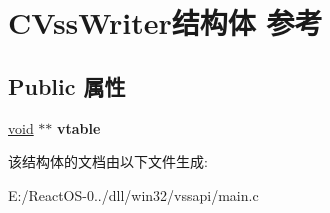 \hypertarget{struct_c_vss_writer}{}\section{C\+Vss\+Writer结构体 参考}
\label{struct_c_vss_writer}
\subsection*{Public 属性}
\begin{DoxyCompactItemize}
\item 
\mbox{\label{struct_c_vss_writer_a115a7330c1ae4a7a2709be10a3447bf7}} 
\hyperlink{interfacevoid}{void} $\ast$$\ast$ {\bfseries vtable}
\end{DoxyCompactItemize}


该结构体的文档由以下文件生成\+:\begin{DoxyCompactItemize}
\item 
E\+:/\+React\+O\+S-\/0../dll/win32/vssapi/main.\+c\end{DoxyCompactItemize}
